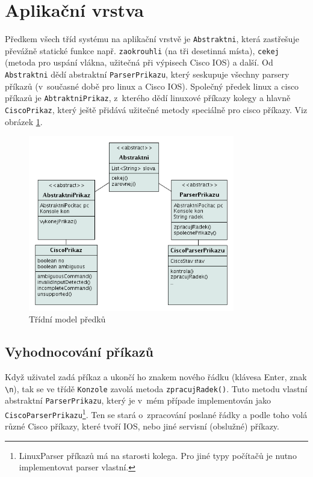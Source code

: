 
\section{Aplikační vrstva}
Předkem všech tříd systému na aplikační vrstvě je \verb|Abstraktni|, která zastřešuje převážně statické funkce např. \verb|zaokrouhli| (na tři desetinná místa), \verb|cekej| (metoda pro uspání vlákna, užitečná při výpisech Cisco IOS) a další. Od \verb|Abstraktni| dědí abstraktní \verb|ParserPrikazu|, který seskupuje všechny parsery příkazů (v~současné době pro linux a Cisco IOS). Společný předek linux a cisco příkazů je \verb|AbtraktniPrikaz|, z~kterého dědí linuxové příkazy kolegy a hlavně \verb|CiscoPrikaz|, který ještě přidává užitečné metody speciálně pro cisco příkazy. Viz obrázek \ref{uml:abstraktni}.

\begin{figure}[h]
\begin{center}
\includegraphics[width=9cm]{figures/uml_abtraktni.png}
\caption{Třídní model předků}
\label{uml:abstraktni}
\end{center}
\end{figure}

\subsection{Vyhodnocování příkazů}
Když uživatel zadá příkaz a ukončí ho znakem nového řádku (klávesa Enter, znak \verb|\n|), tak se ve třídě \verb|Konzole| zavolá metoda \verb|zpracujRadek()|. Tuto metodu vlastní abstraktní \verb|ParserPrikazu|, který je v~mém případe implementován jako \verb|CiscoParserPrikazu|\footnote{LinuxParser příkazů má na starosti kolega. Pro jiné typy počítačů je nutno implementovat parser vlastní.}. Ten se stará o~zpracování poslané řádky a podle toho volá různé Cisco příkazy, které tvoří IOS, nebo jiné servisní (obslužné) příkazy.

